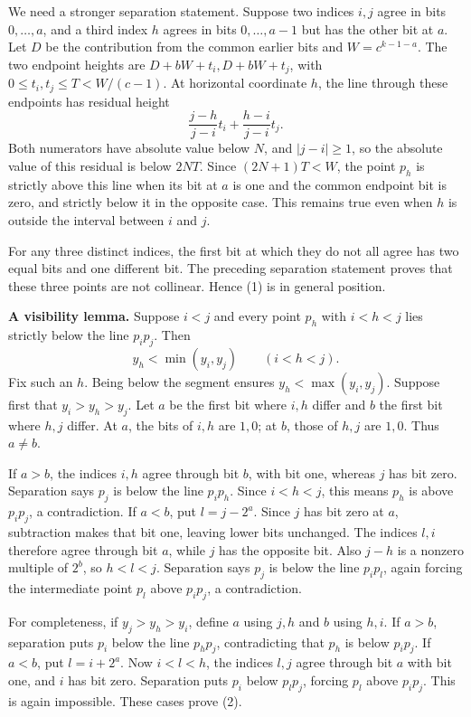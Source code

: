 We need a stronger separation statement. Suppose two indices $i,j$ agree in bits $0,\ldots,a$, and a third index $h$ agrees in bits $0,\ldots,a-1$ but has the other bit at $a$. Let $D$ be the contribution from the common earlier bits and $W=c^{k-1-a}$. The two endpoint heights are $D+bW+t_i,D+bW+t_j$, with $0\leq t_i,t_j\leq T<W/(c-1)$. At horizontal coordinate $h$, the line through these endpoints has residual height
\[
\frac{j-h}{j-i}t_i+\frac{h-i}{j-i}t_j.
\]
Both numerators have absolute value below $N$, and $|j-i|\geq1$, so the absolute value of this residual is below $2NT$. Since $(2N+1)T<W$, the point $p_h$ is strictly above this line when its bit at $a$ is one and the common endpoint bit is zero, and strictly below it in the opposite case. This remains true even when $h$ is outside the interval between $i$ and $j$.

For any three distinct indices, the first bit at which they do not all agree has two equal bits and one different bit. The preceding separation statement proves that these three points are not collinear. Hence (1) is in general position.

\textbf{A visibility lemma.} Suppose $i<j$ and every point $p_h$ with $i<h<j$ lies strictly below the line $p_ip_j$. Then
\[
y_h<\min(y_i,y_j)\qquad(i<h<j).
\tag{2}
\]
Fix such an $h$. Being below the segment ensures $y_h<\max(y_i,y_j)$. Suppose first that $y_i>y_h>y_j$. Let $a$ be the first bit where $i,h$ differ and $b$ the first bit where $h,j$ differ. At $a$, the bits of $i,h$ are $1,0$; at $b$, those of $h,j$ are $1,0$. Thus $a\ne b$.

If $a>b$, the indices $i,h$ agree through bit $b$, with bit one, whereas $j$ has bit zero. Separation says $p_j$ is below the line $p_ip_h$. Since $i<h<j$, this means $p_h$ is above $p_ip_j$, a contradiction.
If $a<b$, put $l=j-2^a$. Since $j$ has bit zero at $a$, subtraction makes that bit one, leaving lower bits unchanged. The indices $l,i$ therefore agree through bit $a$, while $j$ has the opposite bit. Also $j-h$ is a nonzero multiple of $2^b$, so $h<l<j$. Separation says $p_j$ is below the line $p_ip_l$, again forcing the intermediate point $p_l$ above $p_ip_j$, a contradiction.

For completeness, if $y_j>y_h>y_i$, define $a$ using $j,h$ and $b$ using $h,i$. If $a>b$, separation puts $p_i$ below the line $p_hp_j$, contradicting that $p_h$ is below $p_ip_j$. If $a<b$, put $l=i+2^a$. Now $i<l<h$, the indices $l,j$ agree through bit $a$ with bit one, and $i$ has bit zero. Separation puts $p_i$ below $p_lp_j$, forcing $p_l$ above $p_ip_j$. This is again impossible. These cases prove (2).

